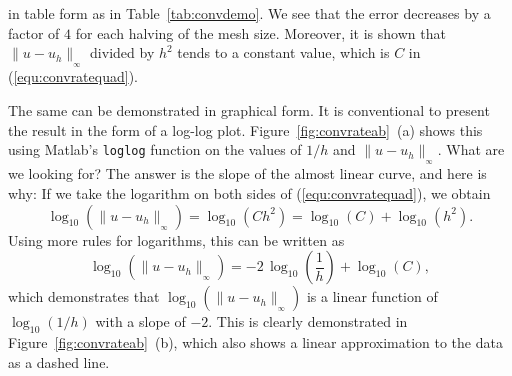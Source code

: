 \documentclass[12pt]{article}
\numberwithin{equation}{section}
\numberwithin{table}{section}
\numberwithin{figure}{section}
\newcommand{\norm}[2]{\|{#1}\|_{{}_{#2}}}
\begin{document}
in table form as in Table~\ref{tab:convdemo}. We see that the error
decreases by a factor of $4$ for each halving of the mesh size.
Moreover, it is shown that $\norm{u - u_h}{\infty}$ divided by $h^2$
tends to a constant value, which is $C$ in (\ref{equ:convratequad}).

The same can be demonstrated in graphical form. It is conventional
to present the result in the form of a log-log plot.
Figure~\ref{fig:convrateab}~(a) shows this using Matlab's \verb+loglog+
function on the values of $1 / h$ and $\norm{u - u_h}{\infty}$.
What are we looking for? The answer is the slope of the almost linear
curve, and here is why: If we take the logarithm on both sides of
(\ref{equ:convratequad}), we obtain
\begin{displaymath}
  \log_{10}\left(\norm{u - u_h}{\infty}\right)
    = \log_{10}\left(C h^2\right)
    = \log_{10}\left(C\right) + \log_{10}\left(h^2\right).
\end{displaymath}
Using more rules for logarithms, this can be written as
\begin{equation} \label{equ:linearity}
  \log_{10}\left(\norm{u - u_h}{\infty}\right) =
    -2 \, \log_{10}\left({\textstyle \frac{1}{h}}\right)
    + \log_{10}\left(C\right),
\end{equation}
which demonstrates that $\log_{10} (\norm{u - u_h}{\infty})$ is
a linear function of $\log_{10} (1/h)$ with a slope of $-2$.
This is clearly demonstrated in Figure~\ref{fig:convrateab}~(b),
which also shows a linear approximation to the data as a dashed line.
\end{document}
